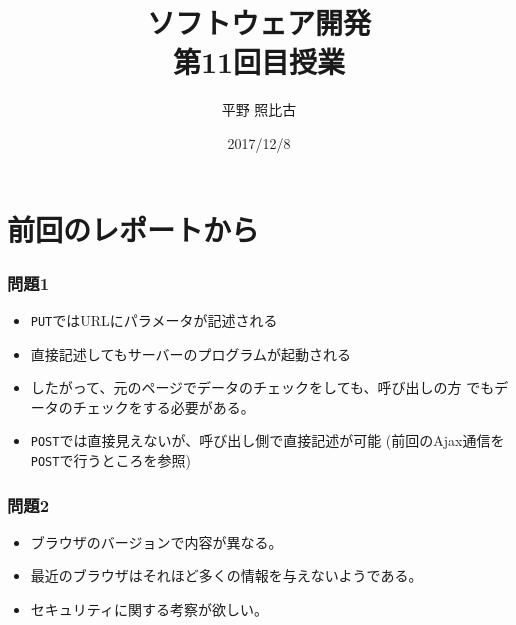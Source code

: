 
\title{ソフトウェア開発\\第11回目授業}
\author{平野 照比古}
\institute{}
\date{2017/12/8}
\newtheorem{Prob}{解説}
\newcommand{\Elm}[1]{\texttt{<#1>}}

\newcommand{\DOMM}{\texttt}
\newcommand{\Event}{\texttt}
\newcommand{\DOMP}{\texttt}
\newcommand{\DOM}{\texttt{DOM}}
\newcommand{\keyitem}{\relax}
\newcommand{\HTML}{HTML文書}

\frame{\maketitle}
\section{前回のレポートから}
 \begin{frame}[containsverbatim]
  \frametitle{問題1}
  \begin{itemize}
   \item \texttt{PUT}ではURLにパラメータが記述される
   \item 直接記述してもサーバーのプログラムが起動される
   \item したがって、元のページでデータのチェックをしても、呼び出しの方
         でもデータのチェックをする必要がある。
   \item \texttt{POST}では直接見えないが、呼び出し側で直接記述が可能
         (前回のAjax通信を\texttt{POST}で行うところを参照)
  \end{itemize}
 \end{frame}
 \begin{frame}[containsverbatim]
  \frametitle{問題2}
  \begin{itemize}
   \item ブラウザのバージョンで内容が異なる。
   \item 最近のブラウザはそれほど多くの情報を与えないようである。
   \item セキュリティに関する考察が欲しい。
  \end{itemize}
 \end{frame}
